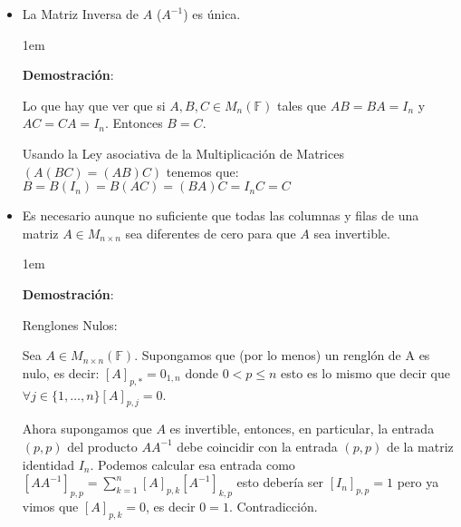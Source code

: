 \documentclass[12pt]{report}                                    %
\newenvironment{SmallIndentation}[1][0.75em]                    %
    {\begin{adjustwidth}{#1}{}\begin{footnotesize}}                 %
    {\end{footnotesize}\end{adjustwidth}}                           %
\begin{document}
                \begin{itemize}

                    \item La Matriz Inversa de $A$ ($A^{-1}$) es única.

                        \begin{SmallIndentation}[1em]
                            \textbf{Demostración}:

                            Lo que hay que ver que si $A,B,C \in M_n(\mathbb{F})$ tales que
                            $AB = BA = I_n$ y $AC = CA = I_n$. Entonces $B=C$.

                            Usando la Ley asociativa de la Multiplicación de Matrices $(A(BC)=(AB)C)$
                            tenemos que:
                            $B = B(I_n) = B(AC) = (BA)C = I_nC =  C $

                        \end{SmallIndentation}

                    \item Es necesario aunque no suficiente que todas las columnas y filas de una
                        matriz $A \in M_{n \times n}$ sea diferentes de cero para que $A$ sea invertible.

                        \begin{SmallIndentation}[1em]
                            \textbf{Demostración}:

                            Renglones Nulos:

                                Sea $A \in M_{n \times n}(\mathbb{F})$.
                                Supongamos que (por lo menos) un renglón de A es nulo, es decir:
                                $[A]_{p,*} = 0_{1,n}$ donde $0 < p \leq n$ esto es lo mismo que decir
                                que $\forall j \in \{1, \dots, n\} [A]_{p,j} = 0$.

                                Ahora supongamos que $A$ es invertible, entonces, en particular, la entrada
                                $(p,p)$ del producto $AA^{-1}$ debe coincidir con la entrada $(p,p)$ de la
                                matriz identidad $I_n$.
                                Podemos calcular esa entrada como
                                $[AA^{-1}]_{p,p} = \sum_{k=1}^{n} [A]_{p,k} [A^{-1}]_{k,p}$
                                esto debería ser $[I_n]_{p,p}=1$ pero ya vimos que $[A]_{p,k} = 0$, es decir
                                $0 = 1$. Contradicción.



\end{SmallIndentation}
\end{itemize}
\end{document}
